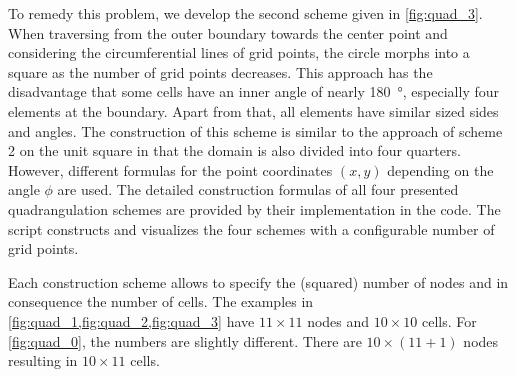 To remedy this problem, we develop the second scheme given in \cref{fig:quad_3}. When traversing from the outer boundary towards the center point and considering the circumferential lines of grid points, the circle morphs into a square as the number of grid points decreases. This approach has the disadvantage that some cells have an inner angle of nearly \SI{180}{\degree}, especially four elements at the boundary. Apart from that, all elements have similar sized sides and angles.
The construction of this scheme is similar to the approach of scheme 2 on the unit square in that the domain is also divided into four quarters. However, different formulas for the point coordinates $(x,y)$ depending on the angle $\phi$ are used.
The detailed construction formulas of all four presented quadrangulation schemes are provided by their implementation in the code. The script  constructs and visualizes the four schemes with a configurable number of grid points.


Each construction scheme allows to specify the (squared) number of nodes and in consequence the number of cells. The examples in \cref{fig:quad_1,fig:quad_2,fig:quad_3} have $11 \times 11$ nodes and $10 \times 10$ cells. For \cref{fig:quad_0}, the numbers are slightly different. There are $10 \times (11 + 1)$ nodes resulting in $10 \times 11$ cells.

